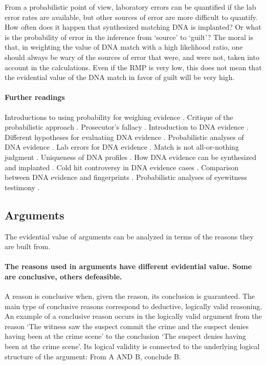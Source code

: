 \documentclass[10pt]{article}
\begin{document}
From a probabilistic point of view, laboratory errors can be quantified if the lab error rates are available, 
but other sources of error are more difficult to quantify. How often does it happen that 
synthesized matching DNA is implanted? Or what is the probability of error 
in the inference from `source' to `guilt'?
The moral is that, in weighting the value of DNA match with a high likelihood ratio, 
one should always be wary of the sources of error that were, and were not, taken into account in the calculations. 
Even if the RMP is very low, this does not mean 
that the evidential value of the DNA match in favor of guilt will be very high. 


\paragraph{Further readings} Introductions to using probability for weighing evidence 
 \citep{finkelsteinFairley1970, dawid2002, mortera2007}. Critique 
of the probabilistic approach \citep{tribe1971, cohen1977, allenPardo2007}.
Prosecutor's fallacy \citep{thompsonSchuman1987}.
Introduction to DNA evidence \citep{wasserman2008, kayeSensabaugh2000}.
Different hypotheses for evaluating DNA evidence \citep{koehler1993, cookEtAl1998, evettEtal2000}. 
Probabilistic analyses of DNA evidence  \citep{robertsonVignaux1995, buckleton2005, balding2005}. 
 Lab errors for DNA evidence \citep{thompsonEtAl2003}. 
 Match is not all-or-nothing judgment \citep{kaye1993}. 
Uniqueness of DNA profiles  \citep{kaye2013, weir2007}.
How DNA evidence can be synthesized and implanted \citep{frumkinEtAl2009}. 
Cold hit controversy in DNA evidence cases \citep{NRC1996, baldingDonnely1996}. 
Comparison between DNA evidence and fingerprints  \citep{zabell2005}. 
Probabilistic analyses of eyewitness testimony \citep{friedman1987, schumStarace2001}. 

\subsection{Arguments}
\label{sec:valueArgs}

The evidential value of arguments can be analyzed in terms of the reasons they are built from.

\paragraph{The reasons used in arguments have different evidential value. Some are conclusive, others defeasible.} A reason is conclusive when, given  the reason, its conclusion is guaranteed. The main type of conclusive reasons correspond to deductive, logically valid reasoning. 
An example of a conclusive reason occurs in the logically valid argument from the reason `The witness saw the suspect commit the crime and the suspect denies having been at the crime scene' to the conclusion `The suspect denies having been at the crime scene'. Its logical validity is connected to the underlying logical structure of the argument: From A AND B, conclude B. 
\end{document}
